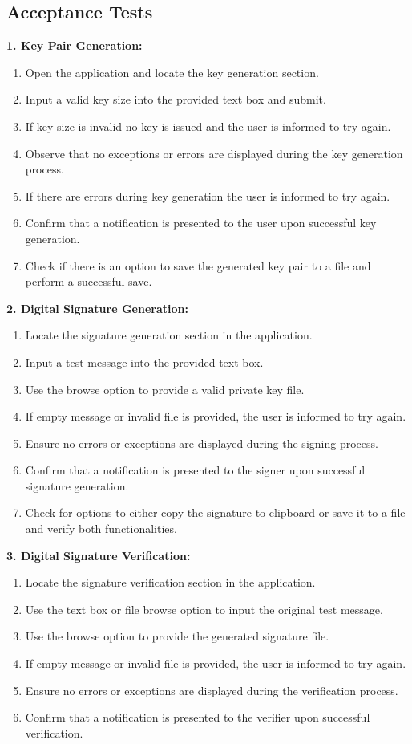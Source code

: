 \documentclass[]{final_report}
\theoremstyle{definition}
\begin{document}
\subsection{Acceptance Tests}

\textbf{1. Key Pair Generation:}
\begin{enumerate}
\item Open the application and locate the key generation section.
\item Input a valid key size into the provided text box and submit.
\item If key size is invalid no key is issued and the user is informed to try again. 
\item Observe that no exceptions or errors are displayed during the key generation process.
\item If there are errors during key generation the user is informed to try again.
\item Confirm that a notification is presented to the user upon successful key generation.
\item Check if there is an option to save the generated key pair to a file and perform a successful save.
\end{enumerate}

\textbf{2. Digital Signature Generation:}
\begin{enumerate}
\item Locate the signature generation section in the application.
\item Input a test message into the provided text box.
\item Use the browse option to provide a valid private key file.
\item If empty message or invalid file is provided, the user is informed to try again. 
\item Ensure no errors or exceptions are displayed during the signing process.
\item Confirm that a notification is presented to the signer upon successful signature generation.
\item Check for options to either copy the signature to clipboard or save it to a file and verify both functionalities.
\end{enumerate}

\textbf{3. Digital Signature Verification:}
\begin{enumerate}
\item Locate the signature verification section in the application.
\item Use the text box or file browse option to input the original test message.
\item Use the browse option to provide the generated signature file.
\item If empty message or invalid file is provided, the user is informed to try again. 
\item Ensure no errors or exceptions are displayed during the verification process.
\item Confirm that a notification is presented to the verifier upon successful verification.
\end{enumerate}
\end{document}
